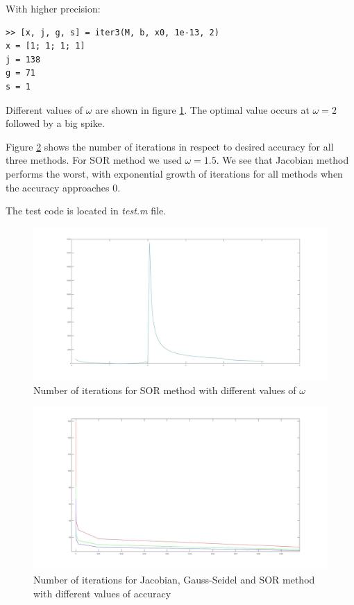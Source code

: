 \documentclass[]{article}
\begin{document}
With higher precision:

\begin{lstlisting}
>> [x, j, g, s] = iter3(M, b, x0, 1e-13, 2)
x = [1; 1; 1; 1]
j = 138
g = 71
s = 1
\end{lstlisting}

Different values of $\omega$ are shown in figure \ref{fig:1-omega}. The optimal
value occurs at $\omega = 2$ followed by a big spike.

Figure \ref{fig:1-acc} shows the number of iterations in respect to desired
accuracy for all three methods. For SOR method we used $\omega = 1.5$. We see
that Jacobian method performs the worst, with exponential growth of iterations
for all methods when the accuracy approaches 0.

The test code is located in \textit{test.m} file.

\begin{figure}
	\centering
	\includegraphics[width=\linewidth]{pics/test1omega.jpg}
	\caption{Number of iterations for SOR method with different values of $\omega$}
	\label{fig:1-omega}
\end{figure}

\begin{figure}
	\centering
	\includegraphics[width=\linewidth]{pics/test1-acc.jpg}
	\caption{Number of iterations for Jacobian, Gauss-Seidel and SOR method with
		different values of accuracy}
	\label{fig:1-acc}
\end{figure}
\end{document}
